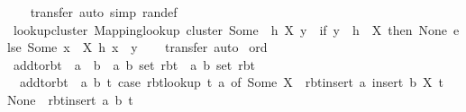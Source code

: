 \begin{isabellebody}
%
\isadelimproof
\ \ %
\endisadelimproof
%
\isatagproof
{}\isamarkupfalse%
\ transfer\ {\isacharparenleft}{\kern0pt}auto\ simp{\isacharcolon}{\kern0pt}\ ran{\isacharunderscore}{\kern0pt}def{\isacharparenright}{\kern0pt}%
\endisatagproof
{\isafoldproof}%
%
\isadelimproof
\isanewline
%
\endisadelimproof
\isanewline
{}\isamarkupfalse%
\ lookup{\isacharunderscore}{\kern0pt}cluster{\isacharprime}{\kern0pt}{\isacharcolon}{\kern0pt}\ {\isachardoublequoteopen}Mapping{\isachardot}{\kern0pt}lookup\ {\isacharparenleft}{\kern0pt}cluster\ {\isacharparenleft}{\kern0pt}Some\ {\isasymcirc}\ h{\isacharparenright}{\kern0pt}\ X{\isacharparenright}{\kern0pt}\ y\ {\isacharequal}{\kern0pt}\ {\isacharparenleft}{\kern0pt}if\ y\ {\isasymnotin}\ h\ {\isacharbackquote}{\kern0pt}\ X\ then\ None\ else\ Some\ {\isacharbraceleft}{\kern0pt}x\ {\isasymin}\ X{\isachardot}{\kern0pt}\ h\ x\ {\isacharequal}{\kern0pt}\ y{\isacharbraceright}{\kern0pt}{\isacharparenright}{\kern0pt}{\isachardoublequoteclose}\isanewline
%
\isadelimproof
\ \ %
\endisadelimproof
%
\isatagproof
{}\isamarkupfalse%
\ transfer\ auto%
\endisatagproof
{\isafoldproof}%
%
\isadelimproof
\isanewline
%
\endisadelimproof
\isanewline
{}\isamarkupfalse%
\ ord\isanewline
{}\isanewline
\isanewline
{}\isamarkupfalse%
\ add{\isacharunderscore}{\kern0pt}to{\isacharunderscore}{\kern0pt}rbt\ {\isacharcolon}{\kern0pt}{\isacharcolon}{\kern0pt}\ {\isachardoublequoteopen}{\isacharprime}{\kern0pt}a\ {\isasymtimes}\ {\isacharprime}{\kern0pt}b\ {\isasymRightarrow}\ {\isacharparenleft}{\kern0pt}{\isacharprime}{\kern0pt}a{\isacharcomma}{\kern0pt}\ {\isacharprime}{\kern0pt}b\ set{\isacharparenright}{\kern0pt}\ rbt\ {\isasymRightarrow}\ {\isacharparenleft}{\kern0pt}{\isacharprime}{\kern0pt}a{\isacharcomma}{\kern0pt}\ {\isacharprime}{\kern0pt}b\ set{\isacharparenright}{\kern0pt}\ rbt{\isachardoublequoteclose}\ \isanewline
\ \ {\isachardoublequoteopen}add{\isacharunderscore}{\kern0pt}to{\isacharunderscore}{\kern0pt}rbt\ {\isacharequal}{\kern0pt}\ {\isacharparenleft}{\kern0pt}{\isasymlambda}{\isacharparenleft}{\kern0pt}a{\isacharcomma}{\kern0pt}\ b{\isacharparenright}{\kern0pt}\ t{\isachardot}{\kern0pt}\ case\ rbt{\isacharunderscore}{\kern0pt}lookup\ t\ a\ of\ Some\ X\ {\isasymRightarrow}\ rbt{\isacharunderscore}{\kern0pt}insert\ a\ {\isacharparenleft}{\kern0pt}insert\ b\ X{\isacharparenright}{\kern0pt}\ t\ {\isacharbar}{\kern0pt}\ None\ {\isasymRightarrow}\ rbt{\isacharunderscore}{\kern0pt}insert\ a\ {\isacharbraceleft}{\kern0pt}b{\isacharbraceright}{\kern0pt}\ t{\isacharparenright}{\kern0pt}{\isachardoublequoteclose}\isanewline

\end{isabellebody}
